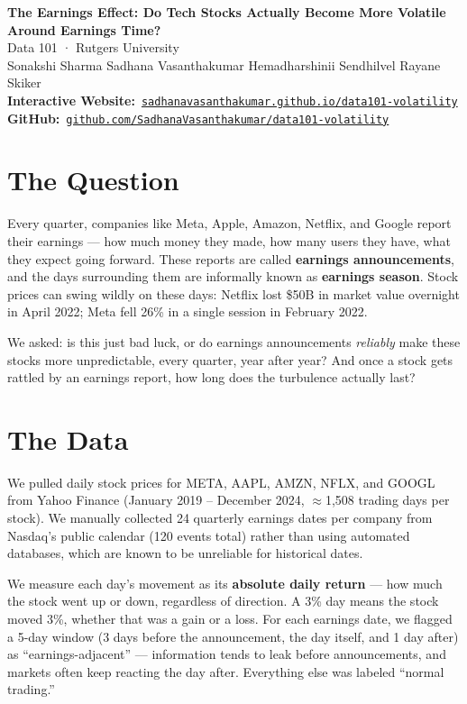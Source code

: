 \documentclass[11pt, letterpaper]{article}
\begin{document}
\begin{center}
  {\large\bfseries The Earnings Effect: Do Tech Stocks Actually Become More Volatile Around Earnings Time?}\\[5pt]
  {\small Data 101 · Rutgers University}\\[3pt]
  {\small Sonakshi Sharma \quad Sadhana Vasanthakumar \quad Hemadharshinii Sendhilvel \quad Rayane Skiker}\\[5pt]
  \textbf{Interactive Website:}~\href{https://sadhanavasanthakumar.github.io/data101-volatility/}{\texttt{sadhanavasanthakumar.github.io/data101-volatility}}\\
  \textbf{GitHub:}~\href{https://github.com/SadhanaVasanthakumar/data101-volatility}{\texttt{github.com/SadhanaVasanthakumar/data101-volatility}}
\end{center}

\section{The Question}

Every quarter, companies like Meta, Apple, Amazon, Netflix, and Google report
their earnings --- how much money they made, how many users they have, what
they expect going forward. These reports are called \textbf{earnings
announcements}, and the days surrounding them are informally known as
\textbf{earnings season}. Stock prices can swing wildly on these days:
Netflix lost \$50B in market value overnight in April 2022; Meta fell 26\%
in a single session in February 2022.

We asked: is this just bad luck, or do earnings announcements
\textit{reliably} make these stocks more unpredictable, every quarter, year
after year? And once a stock gets rattled by an earnings report, how long
does the turbulence actually last?

\section{The Data}

We pulled daily stock prices for META, AAPL, AMZN, NFLX, and GOOGL from
Yahoo Finance (January 2019 -- December 2024, $\approx$1,508 trading days per
stock). We manually collected 24 quarterly earnings dates per company from
Nasdaq's public calendar (120 events total) rather than using automated
databases, which are known to be unreliable for historical dates.

We measure each day's movement as its \textbf{absolute daily return} --- how
much the stock went up or down, regardless of direction. A 3\% day means the
stock moved 3\%, whether that was a gain or a loss. For each earnings date,
we flagged a 5-day window (3 days before the announcement, the day itself, and
1 day after) as ``earnings-adjacent'' --- information tends to leak before
announcements, and markets often keep reacting the day after. Everything else
was labeled ``normal trading.''
\end{document}
